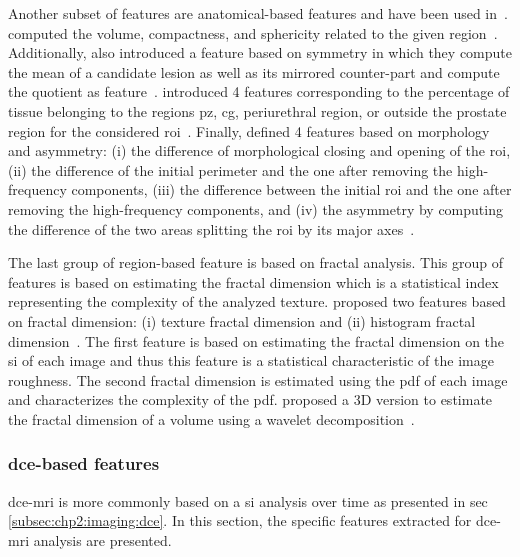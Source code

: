 Another subset of features are anatomical-based features and have been used in~\cite{Litjens2012,Litjens2014,Matulewicz2013,cameron2014multiparametric,cameron2016maps}.
\citeauthor{Litjens2012} computed the volume, compactness, and sphericity related to the given region~\cite{Litjens2012, Litjens2014}.
Additionally, \citeauthor{Litjens2014} also introduced a feature based on symmetry in which they compute the mean of a candidate lesion as well as its mirrored counter-part and compute the quotient as feature~\cite{Litjens2014}.
\citeauthor{Matulewicz2013} introduced 4 features corresponding to the percentage of tissue belonging to the regions \ac{pz}, \ac{cg}, periurethral region, or outside the prostate region for the considered \ac{roi}~\cite{Matulewicz2013}.
Finally, \citeauthor{cameron2016maps} defined 4 features based on morphology and asymmetry:
(i) the difference of morphological closing and opening of the \ac{roi}, (ii) the difference of the initial perimeter and the one after removing the high-frequency components, (iii) the difference between the initial \ac{roi} and the one after removing the high-frequency components, and (iv) the asymmetry by computing the difference of the two areas splitting the \ac{roi} by its major axes~\cite{cameron2014multiparametric,cameron2016maps}.

The last group of region-based feature is based on fractal analysis.
This group of features is based on estimating the fractal dimension which is a statistical index representing the complexity of the analyzed texture.
\citeauthor{Lv2009} proposed two features based on fractal dimension: (i) texture fractal dimension and (ii) histogram fractal dimension~\cite{Lv2009}.
The first feature is based on estimating the fractal dimension on the \ac{si} of each image and thus this feature is a statistical characteristic of the image roughness.
The second fractal dimension is estimated using the \ac{pdf} of each image and characterizes the complexity of the \ac{pdf}.
\citeauthor{Lopes2011} proposed a 3D version to estimate the fractal dimension of a volume using a wavelet decomposition~\cite{Lopes2011}.

\subsubsection{\acs*{dce}-based features}\label{subsubsec:chp3:img-clas:CADX-fea-dec:DCE-fea}

\ac{dce}-\ac{mri} is more commonly based on a \ac{si} analysis over time as presented in \acs{sec}\,\ref{subsec:chp2:imaging:dce}.
In this section, the specific features extracted for \ac{dce}-\ac{mri} analysis are presented.

